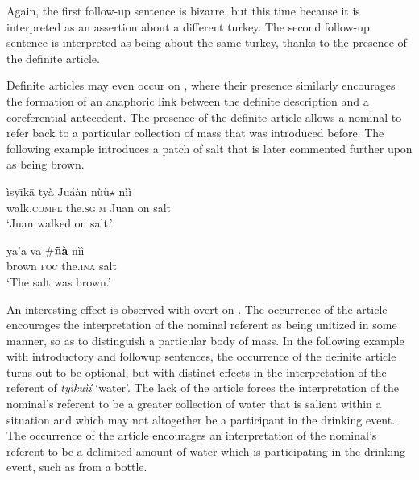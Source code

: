\documentclass[output=paper,modfonts,nonflat]{langsci/langscibook}
\begin{document}
\z 
\z 

Again, the first follow-up sentence is bizarre, but this time because it is interpreted as an assertion about a different turkey.  The second follow-up sentence is interpreted as being about the same turkey, thanks to the presence of the definite article.

Definite articles may even occur on , where their presence similarly encourages the formation of an anaphoric link between the definite description and a coreferential antecedent.  The presence of the definite article allows a nominal to refer back to a particular collection of mass that was introduced before.  The following example introduces a patch of salt that is later commented further upon as being brown.

\ea {}\label{ex:cisneros:68}
\gll
\`isy\=\i k\=a {\ob}ty\`a Ju\'a\`an{\cb} n\`u\`u$\star$ n\`i\`i\\
walk.\textsc{compl} {\db}the.\textsc{sg.m} Juan on salt\\
\glt
`Juan walked on salt.'

\ea
\gll
y\=a'\=a v\=a {\ob}\textnormal{\#}{\op}\textbf{\~n\`a}{\cp} n\`i\`i{\cb}\\
brown \textsc{foc} \phantom{[\#(}the.\textsc{ina} salt\\
\glt
`The salt was brown.'
\z 
\z

An interesting effect is observed with overt  on .  The occurrence of the article encourages the interpretation of the nominal referent as being unitized in some manner, so as to distinguish a particular body of mass.  In the following example with introductory and followup sentences, the occurrence of the definite article turns out to be optional, but with distinct effects in the interpretation of the referent of \textit{ty\`iku\`i\'i} `water'.  The lack of the article forces the interpretation of the nominal's referent to be a greater collection of water that is salient within a situation and which may not altogether be a participant in the drinking event.  The occurrence of the article encourages an interpretation of the nominal's referent to be a delimited amount of water which is participating in the drinking event, such as from a bottle.
\end{document}
